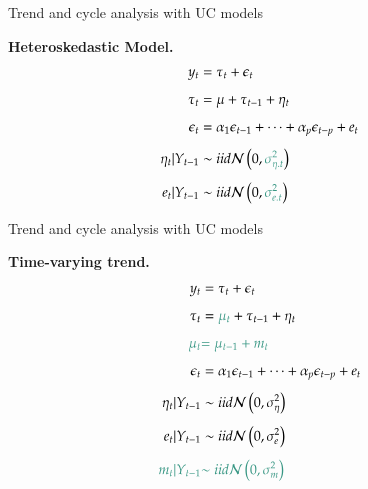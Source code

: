\documentclass[notes,blackandwhite,mathsans]{beamer}
\begin{document}
\begin{frame}{Trend and cycle analysis with UC models}

\bigskip\textbf{Heteroskedastic Model.}
\begin{align*}
y_t &= \tau_t + \epsilon_t\\[1ex]
\tau_t &= \mu + \tau_{t-1} + \eta_t \\[1ex]
\epsilon_t &= \alpha_1 \epsilon_{t-1} + \dots +  \alpha_p \epsilon_{t-p} + e_t \\[1ex]
\eta_t|Y_{t-1} &\sim iid\mathcal{N}\left(0,{\color{mcxs2}\sigma_{\eta.t}^2}\right)\\[1ex]
e_t |Y_{t-1} &\sim iid\mathcal{N}\left(0,{\color{mcxs2}\sigma_{e.t}^2}\right)
\end{align*}
\end{frame}







\begin{frame}{Trend and cycle analysis with UC models}

\bigskip\textbf{Time-varying trend.}
\begin{align*}
y_t &= \tau_t + \epsilon_t\\[1ex]
\tau_t &= {\color{mcxs2}\mu_t} + \tau_{t-1} + \eta_t \\[1ex]
{\color{mcxs2}\mu_t} &{\color{mcxs2}= \mu_{t-1} + m_t} \\[1ex]
\epsilon_t &= \alpha_1 \epsilon_{t-1} + \dots +  \alpha_p \epsilon_{t-p} + e_t \\[1ex]
\eta_t|Y_{t-1} &\sim iid\mathcal{N}\left(0,\sigma_\eta^2\right)\\[1ex]
e_t |Y_{t-1} &\sim iid\mathcal{N}\left(0,\sigma_e^2\right)\\[1ex]
{\color{mcxs2}m_t |Y_{t-1}} &{\color{mcxs2}\sim iid\mathcal{N}\left(0,\sigma_m^2\right)}
\end{align*}

\end{frame}
\end{document}

